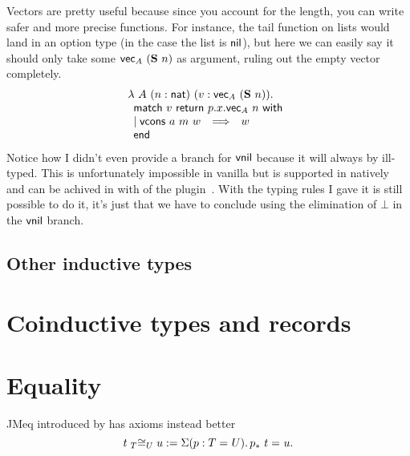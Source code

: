 Vectors are pretty useful because since you account for the length, you can
write safer and more precise functions. For instance, the tail function on lists
would land in an option type (in the case the list is \(\nil\)), but here we
can easily say it should only take some \(\tvec_A\ (\natsucc\ n)\) as argument,
ruling out the empty vector completely.
\[
  \begin{array}{l}
    \lambda\ A\ (n : \nat)\ (v : \tvec_A\ (\natsucc\ n)). \\
    \pmatch{v}{p.x. \tvec_A\ n}{
      \branch{\vcons\ a\ m\ w}{w}
    }
  \end{array}
\]
Notice how I didn't even provide a branch for \(\vnil\) because it will always
by ill-typed. This is unfortunately impossible in vanilla \Coq but is supported
in \Agda natively and can be achived in \Coq with \Program of the \Equations
plugin~.
With the typing rules I gave it is still possible to do it, it's just that we
have to conclude using the elimination of \(\bot\) in the \(\vnil\) branch.


\subsection{Other inductive types}

\section{Coinductive types and records}

\section{Equality}


\acrfull{JMeq} introduced by
 has axioms
instead better
\[ \Heq{T}{t}{U}{u} := \Sum{p:\Eq{}{T}{U}} \Eq{}{\transpo{p}\ t}{u}. \]